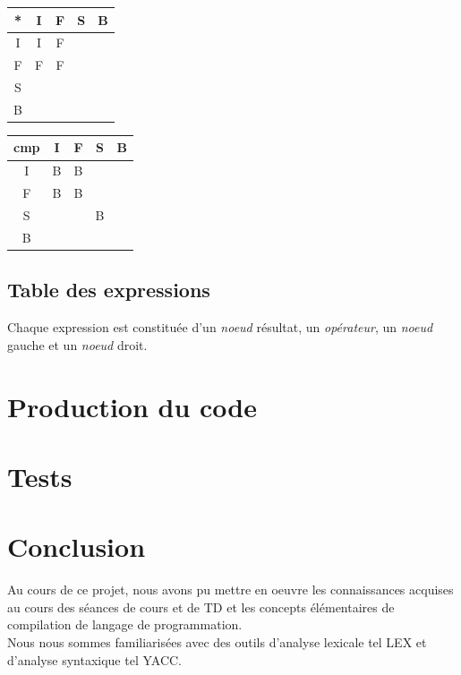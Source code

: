 \documentclass{article}
\begin{document}
\begin{center}
\begin{tabular}{|c|c|c|c|c|}
  \hline
  * & I & F & S & B \\
  \hline
  I & I & F &   &  \\
  \hline
  F & F & F &   & \\
  \hline
  S &   &   &  & \\
  \hline
  B & & & & \\
\hline
\end{tabular}
\end{center}



\begin{center}
\begin{tabular}{|c|c|c|c|c|}
  \hline
  cmp & I & F & S & B \\
  \hline
  I & B & B &   &  \\
  \hline
  F & B & B &   & \\
  \hline
  S &   &   & B  & \\
  \hline
  B & & & & \\
\hline
\end{tabular}
\end{center}


\subsection{Table des expressions}
Chaque expression est constituée d'un \emph{noeud} résultat, un \emph{opérateur}, un \emph{noeud} gauche et un \emph{noeud} droit. 

\newpage
\section{Production du code}


\newpage
\section{Tests}


\newpage
\section*{Conclusion}
Au cours de ce projet, nous avons pu mettre en oeuvre les connaissances acquises au cours des séances de cours et de TD et les concepts élémentaires de compilation de langage de programmation. \\

Nous nous sommes familiarisées avec des outils d'analyse lexicale tel LEX et d'analyse syntaxique tel YACC.
\end{document}
